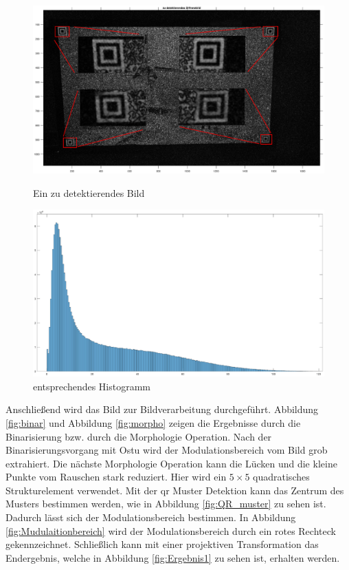 \begin{figure}[H]
\centering 
\begin{minipage}[b]{0.49\textwidth} 
\centering 
\includegraphics[width=1.0\textwidth]{images/5_Implementirung/Diff/zudifferenzbild.eps} 
\caption{Ein zu detektierendes Bild}
\label{fig:nachdiff}
\end{minipage}
\begin{minipage}[b]{0.49\textwidth} 
\centering 
\includegraphics[width=1.0\textwidth]{images/5_Implementirung/Diff/histogramm.eps}
\caption{entsprechendes Histogramm}
\label{fig:Histogramm}
\end{minipage}
\end{figure}

Anschließend wird das Bild zur Bildverarbeitung durchgeführt. Abbildung \ref{fig:binar} und Abbildung \ref{fig:morpho} zeigen die Ergebnisse durch die Binarisierung bzw. durch die Morphologie Operation. Nach der Binarisierungsvorgang mit Ostu wird der Modulationsbereich vom Bild grob extrahiert. Die nächste Morphologie Operation kann die Lücken und die kleine Punkte vom Rauschen stark reduziert. Hier wird ein $ 5 \times 5 $ quadratisches Strukturelement verwendet. Mit der \gls{qr} Muster Detektion kann das Zentrum des Musters bestimmen werden, wie in Abbildung \ref{fig:QR_muster} zu sehen ist. Dadurch lässt sich der Modulationsbereich bestimmen. In Abbildung \ref{fig:Mudulaitionbereich} wird der Modulationsbereich durch ein rotes Rechteck gekennzeichnet. Schließlich kann mit einer projektiven Transformation das Endergebnis, welche in Abbildung \ref{fig:Ergebnis1} zu sehen ist, erhalten werden.

